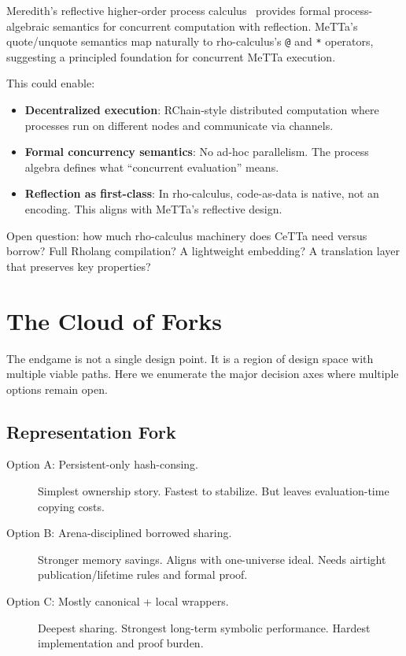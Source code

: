 \documentclass[11pt]{article}
\newcommand{\code}[1]{\texttt{#1}}
\newcommand{\CeTTa}{\textup{CeTTa}}
\begin{document}
Meredith's reflective higher-order process calculus~\cite{Meredith2005}
provides formal process-algebraic semantics for concurrent computation
with reflection.  MeTTa's quote/unquote semantics map naturally to
rho-calculus's \code{@} and \code{*} operators, suggesting a principled
foundation for concurrent MeTTa execution.

This could enable:
\begin{itemize}
\item \textbf{Decentralized execution}: RChain-style distributed computation
  where processes run on different nodes and communicate via channels.
\item \textbf{Formal concurrency semantics}: No ad-hoc parallelism.  The
  process algebra defines what ``concurrent evaluation'' means.
\item \textbf{Reflection as first-class}: In rho-calculus, code-as-data is
  native, not an encoding.  This aligns with MeTTa's reflective design.
\end{itemize}

Open question: how much rho-calculus machinery does \CeTTa{} need versus
borrow?  Full Rholang compilation?  A lightweight embedding?  A translation
layer that preserves key properties?

\section{The Cloud of Forks}
\label{sec:forks}

The endgame is not a single design point.  It is a region of design
space with multiple viable paths.  Here we enumerate the major decision
axes where multiple options remain open.

\subsection{Representation Fork}

\begin{description}
\item[Option A: Persistent-only hash-consing.]
  Simplest ownership story.  Fastest to stabilize.  But leaves
  evaluation-time copying costs.
\item[Option B: Arena-disciplined borrowed sharing.]
  Stronger memory savings.  Aligns with one-universe ideal.  Needs
  airtight publication/lifetime rules and formal proof.
\item[Option C: Mostly canonical + local wrappers.]
  Deepest sharing.  Strongest long-term symbolic performance.  Hardest
  implementation and proof burden.
\end{description}
\end{document}

